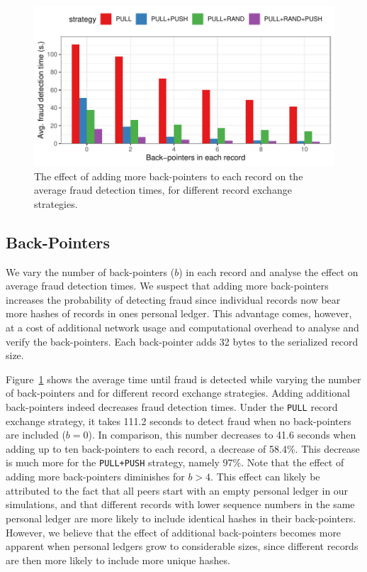 \begin{figure}[t]
	\centering
	\includegraphics[width=.9\linewidth]{trustchain/assets/fraud_times_back_pointers}
	\caption{The effect of adding more back-pointers to each record on the average fraud detection times, for different record exchange strategies.}
	\label{fig:fraud_times_back_pointers}
\end{figure}

\subsection{Back-Pointers}
We vary the number of back-pointers ($ b $) in each record and analyse the effect on average fraud detection times.
We suspect that adding more back-pointers increases the probability of detecting fraud since individual records now bear more hashes of records in ones personal ledger.
This advantage comes, however, at a cost of additional network usage and computational overhead to analyse and verify the back-pointers.
Each back-pointer adds 32 bytes to the serialized record size.

Figure~\ref{fig:fraud_times_back_pointers} shows the average time until fraud is detected while varying the number of back-pointers and for different record exchange strategies.
Adding additional back-pointers indeed decreases fraud detection times.
Under the \texttt{PULL} record exchange strategy, it takes 111.2 seconds to detect fraud when no back-pointers are included ($ b = 0 $). In comparison, this number decreases to 41.6 seconds when adding up to ten back-pointers to each record, a decrease of 58.4\%.
This decrease is much more for the \texttt{PULL+PUSH} strategy, namely 97\%.
Note that the effect of adding more back-pointers diminishes for $ b > 4 $.
This effect can likely be attributed to the fact that all peers start with an empty personal ledger in our simulations, and that different records with lower sequence numbers in the same personal ledger are more likely to include identical hashes in their back-pointers.
However, we believe that the effect of additional back-pointers becomes more apparent when personal ledgers grow to considerable sizes, since different records are then more likely to include more unique hashes.

